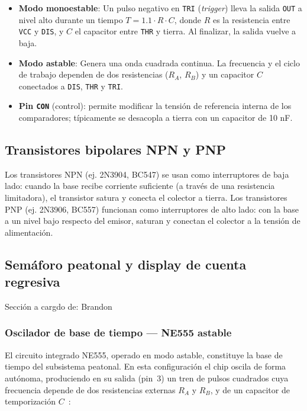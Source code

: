 \documentclass[journal]{IEEEtran}
\begin{document}
\begin{itemize}
    \item \textbf{Modo monoestable}: Un pulso negativo en \texttt{TRI} (\textit{trigger}) lleva la salida \texttt{OUT} a nivel alto durante un tiempo \(T = 1.1 \cdot R \cdot C\), donde \(R\) es la resistencia entre \texttt{VCC} y \texttt{DIS}, y \(C\) el capacitor entre \texttt{THR} y tierra. Al finalizar, la salida vuelve a baja.
    \item \textbf{Modo astable}: Genera una onda cuadrada continua. La frecuencia y el ciclo de trabajo dependen de dos resistencias (\(R_A\), \(R_B\)) y un capacitor \(C\) conectados a \texttt{DIS}, \texttt{THR} y \texttt{TRI}.
    \item \textbf{Pin \texttt{CON}} (control): permite modificar la tensión de referencia interna de los comparadores; típicamente se desacopla a tierra con un capacitor de 10 nF.
\end{itemize}

\subsection{Transistores bipolares NPN y PNP}

Los transistores NPN (ej. 2N3904, BC547) se usan como interruptores de baja lado: cuando la base recibe corriente suficiente (a través de una resistencia limitadora), el transistor satura y conecta el colector a tierra. Los transistores PNP (ej. 2N3906, BC557) funcionan como interruptores de alto lado: con la base a un nivel bajo respecto del emisor, saturan y conectan el colector a la tensión de alimentación.

\subsection{Semáforo peatonal y display de cuenta regresiva}
Sección a cargdo de: Brandon
\subsubsection{Oscilador de base de tiempo — NE555 astable}

El circuito integrado NE555, operado en modo astable, constituye la base de tiempo del
subsistema peatonal. En esta configuración el chip oscila de forma autónoma, produciendo
en su salida (pin~3) un tren de pulsos cuadrados cuya frecuencia depende de dos
resistencias externas $R_A$ y $R_B$, y de un capacitor de temporización
$C$~\cite{Floyd2008}:
\end{document}
